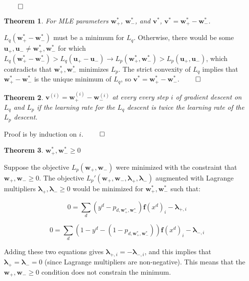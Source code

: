 \documentclass[11pt,letterpaper]{article}
\newtheorem{theorem}{Theorem}[section]
\begin{document}
$\qed$

\begin{theorem}
For MLE parameters $\mathbf{w}_+^*$, $\mathbf{w}_-^*$, and $\mathbf{v}^*$, $\mathbf{v}^*=\mathbf{w}_+^*-\mathbf{w}_-^*$.
\end{theorem}

$L_q(\mathbf{w}_+^*-\mathbf{w}_-^*)$ must be a minimum for $L_q$.  Otherwise, there
would be some $\mathbf{u}_+,\mathbf{u}_-\neq \mathbf{w}_+^*,\mathbf{w}_-^*$ for which 
$L_q(\mathbf{w}_+^*-\mathbf{w}_-^*) > L_q(\mathbf{u}_+-\mathbf{u}_-)\rightarrow L_p(\mathbf{w}_+^*,\mathbf{w}_-^*) > L_p(\mathbf{u}_+,\mathbf{u}_-)$, which contradicts that $\mathbf{w}_+^*,\mathbf{w}_-^*$ minimizes $L_p$.
The strict convexity of $L_q$ implies that $\mathbf{w}_+^*-\mathbf{w}_-^*$ is 
the unique minimum of $L_q$, so $\mathbf{v}^*=\mathbf{w}_+^*-\mathbf{w}_-^*$. 
$\qed$


\begin{theorem}
$\mathbf{v}^{(i)}=\mathbf{w}_+^{(i)}-\mathbf{w}_-^{(i)}$ at every every step $i$ of gradient
descent on $L_q$ and $L_p$ if the learning rate for the $L_q$ 
descent is twice the learning rate of the $L_p$ descent. 
\end{theorem}

Proof is by induction on $i$. $\qed$

\begin{theorem}
$\mathbf{w}_+^*,\mathbf{w}_-^*\geq 0$
\end{theorem}

Suppose the objective $L_p(\mathbf{w}_+,\mathbf{w}_-)$ were minimized with the constraint that $\mathbf{w}_+,\mathbf{w}_-\geq 0$.  The objective 
$L_p'(\mathbf{w}_+,\mathbf{w}_-,\mathbf{\lambda}_+,\mathbf{\lambda}_-)$ augmented with
Lagrange multipliers $\mathbf{\lambda}_+,\mathbf{\lambda}_-\geq 0$ would be
minimized for $\mathbf{w}_+^*,\mathbf{w}_-^*$ such that:

\begin{equation}
0 = \sum_d(y^d-p_{d,\mathbf{w}_+^*,\mathbf{w}_-^*})\mathbf{f}(x^d)_i-\mathbf{\lambda}_{+,i}
\end{equation}

\begin{equation}
0 = \sum_d(1-y^d-(1-p_{d,\mathbf{w}_+^*,\mathbf{w}_-^*}))\mathbf{f}(x^d)_i-\mathbf{\lambda}_{-,i}
\end{equation}

Adding these two equations gives $\mathbf{\lambda}_{+,i}=-\mathbf{\lambda}_{-,i}$,
and this implies that $\mathbf{\lambda}_+=\mathbf{\lambda}_-=0$ 
(since Lagrange multipliers are non-negative).  This means that the $\mathbf{w}_+,\mathbf{w}_-\geq 0$
condition does not constrain the minimum.
\end{document}

